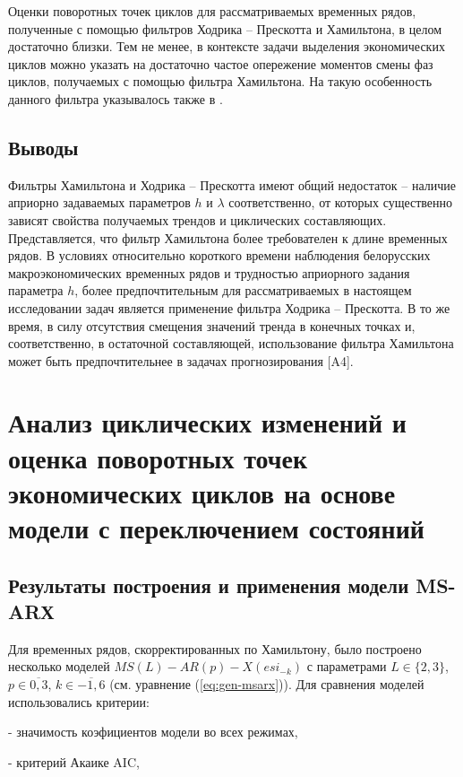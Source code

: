 \documentclass[a4paper,14pt]{extreport}
\begin{document}
	Оценки поворотных точек циклов для рассматриваемых временных рядов, полученные с помощью фильтров Ходрика -- Прескотта и Хамильтона, в целом достаточно близки. Тем не менее, в контексте задачи выделения экономических циклов можно указать на достаточно частое опережение моментов смены фаз циклов, получаемых с помощью фильтра Хамильтона. На такую особенность данного фильтра указывалось также в \cite{schuler_detrend}.
	
	\subsection{Выводы}
	
	Фильтры Хамильтона и Ходрика -- Прескотта  имеют  общий недостаток -- наличие априорно задаваемых параметров $h$ и $\lambda$ соответственно, от которых существенно зависят свойства получаемых трендов и циклических составляющих. Представляется, что фильтр Хамильтона более требователен к длине временных рядов.  В условиях относительно короткого времени наблюдения белорусских макроэкономических временных рядов и трудностью априорного задания параметра $h$, более предпочтительным для рассматриваемых в настоящем исследовании задач является применение фильтра Ходрика -- Прескотта. В то же время, в силу отсутствия смещения значений тренда в конечных точках и, соответственно, в остаточной составляющей, использование фильтра Хамильтона может быть предпочтительнее в  задачах прогнозирования [A4].
	

	\section{Анализ циклических изменений и оценка поворотных точек экономических циклов на основе модели с переключением состояний}
	
	\subsection{Результаты построения и применения модели MS-ARХ}
	
	Для временных рядов, скорректированных по Хамильтону, было построено несколько моделей $MS(L)-AR(p)-X(esi_{-k})$ с параметрами $L \in \{2,3\}$, $p \in \overline{0,3}$, $k \in \overline{-1,6}$ (см. уравнение (\ref{eq:gen-msarx})). Для сравнения моделей использовались критерии:
	
	- значимость коэфициентов модели во всех режимах,
	
	- критерий Акаике AIC,
	
\end{document}
